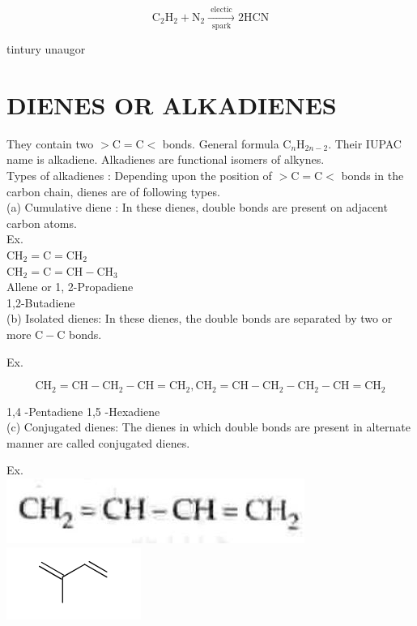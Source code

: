 \documentclass[10pt]{article}
\begin{document}
$$
\mathrm{C}_{2} \mathrm{H}_{2}+\mathrm{N}_{2} \xrightarrow[\text { spark }]{\text { electic }} 2 \mathrm{HCN}
$$

tintury unaugor

\section*{DIENES OR ALKADIENES}
They contain two $>\mathrm{C}=\mathrm{C}<$ bonds. General formula $\mathrm{C}_{n} \mathrm{H}_{2 n-2}$. Their IUPAC name is alkadiene. Alkadienes are functional isomers of alkynes.\\
Types of alkadienes : Depending upon the position of $>\mathrm{C}=\mathrm{C}<$ bonds in the carbon chain, dienes are of following types.\\
(a) Cumulative diene : In these dienes, double bonds are present on adjacent carbon atoms.\\
Ex.\\
$\mathrm{CH}_{2}=\mathrm{C}=\mathrm{CH}_{2}$\\
$\mathrm{CH}_{2}=\mathrm{C}=\mathrm{CH}-\mathrm{CH}_{3}$\\
Allene or 1, 2-Propadiene\\
1,2-Butadiene\\
(b) Isolated dienes: In these dienes, the double bonds are separated by two or more $\mathrm{C}-\mathrm{C}$ bonds.

Ex.

$$
\mathrm{CH}_{2}=\mathrm{CH}-\mathrm{CH}_{2}-\mathrm{CH}=\mathrm{CH}_{2}, \mathrm{CH}_{2}=\mathrm{CH}-\mathrm{CH}_{2}-\mathrm{CH}_{2}-\mathrm{CH}=\mathrm{CH}_{2}
$$

1,4 -Pentadiene 1,5 -Hexadiene\\
(c) Conjugated dienes: The dienes in which double bonds are present in alternate manner are called conjugated dienes.

Ex.\\
\includegraphics[max width=\textwidth, center]{2025_01_28_8470952b98110cec3aabg-195}\\
\includegraphics{smile-ac2e722028a3650b6eebf090a7195b9f1437eb28}
\end{document}
